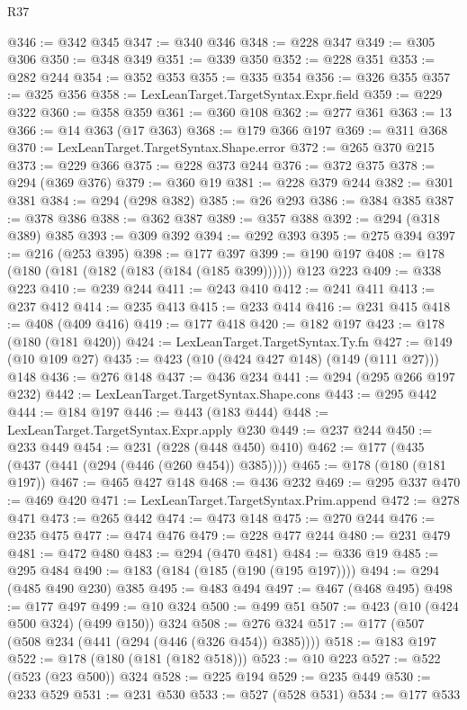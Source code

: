 \begin{lexlean}{R37}
\begin{coremodule}
@346 := @342 @345
@347 := @340 @346
@348 := @228 @347
@349 := @305 @306
@350 := @348 @349
@351 := @339 @350
@352 := @228 @351
@353 := @282 @244
@354 := @352 @353
@355 := @335 @354
@356 := @326 @355
@357 := @325 @356
@358 := LexLeanTarget.TargetSyntax.Expr.field
@359 := @229 @322
@360 := @358 @359
@361 := @360 @108
@362 := @277 @361
@363 := 13
@366 := @14 @363 (@17 @363)
@368 := @179 @366 @197
@369 := @311 @368
@370 := LexLeanTarget.TargetSyntax.Shape.error
@372 := @265 @370 @215
@373 := @229 @366
@375 := @228 @373 @244
@376 := @372 @375
@378 := @294 (@369 @376)
@379 := @360 @19
@381 := @228 @379 @244
@382 := @301 @381
@384 := @294 (@298 @382)
@385 := @26 @293
@386 := @384 @385
@387 := @378 @386
@388 := @362 @387
@389 := @357 @388
@392 := @294 (@318 @389) @385
@393 := @309 @392
@394 := @292 @393
@395 := @275 @394
@397 := @216 (@253 @395)
@398 := @177 @397
@399 := @190 @197
@408 := @178 (@180 (@181 (@182 (@183 (@184 (@185 @399)))))) @123 @223
@409 := @338 @223
@410 := @239 @244
@411 := @243 @410
@412 := @241 @411
@413 := @237 @412
@414 := @235 @413
@415 := @233 @414
@416 := @231 @415
@418 := @408 (@409 @416)
@419 := @177 @418
@420 := @182 @197
@423 := @178 (@180 (@181 @420))
@424 := LexLeanTarget.TargetSyntax.Ty.fn
@427 := @149 (@10 @109 @27)
@435 := @423 (@10 (@424 @427 @148) (@149 (@111 @27))) @148
@436 := @276 @148
@437 := @436 @234
@441 := @294 (@295 @266 @197 @232)
@442 := LexLeanTarget.TargetSyntax.Shape.cons
@443 := @295 @442
@444 := @184 @197
@446 := @443 (@183 @444)
@448 := LexLeanTarget.TargetSyntax.Expr.apply @230
@449 := @237 @244
@450 := @233 @449
@454 := @231 (@228 (@448 @450) @410)
@462 := @177 (@435 (@437 (@441 (@294 (@446 (@260 @454)) @385))))
@465 := @178 (@180 (@181 @197))
@467 := @465 @427 @148
@468 := @436 @232
@469 := @295 @337
@470 := @469 @420
@471 := LexLeanTarget.TargetSyntax.Prim.append
@472 := @278 @471
@473 := @265 @442
@474 := @473 @148
@475 := @270 @244
@476 := @235 @475
@477 := @474 @476
@479 := @228 @477 @244
@480 := @231 @479
@481 := @472 @480
@483 := @294 (@470 @481)
@484 := @336 @19
@485 := @295 @484
@490 := @183 (@184 (@185 (@190 (@195 @197))))
@494 := @294 (@485 @490 @230) @385
@495 := @483 @494
@497 := @467 (@468 @495)
@498 := @177 @497
@499 := @10 @324
@500 := @499 @51
@507 := @423 (@10 (@424 @500 @324) (@499 @150)) @324
@508 := @276 @324
@517 := @177 (@507 (@508 @234 (@441 (@294 (@446 (@326 @454)) @385))))
@518 := @183 @197
@522 := @178 (@180 (@181 (@182 @518)))
@523 := @10 @223
@527 := @522 (@523 (@23 @500)) @324
@528 := @225 @194
@529 := @235 @449
@530 := @233 @529
@531 := @231 @530
@533 := @527 (@528 @531)
@534 := @177 @533

\end{coremodule}
\end{lexlean}
